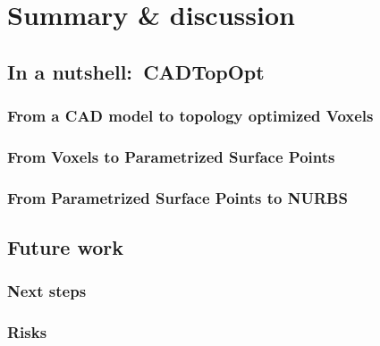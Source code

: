 \chapter{Summary \& discussion}
\label{chapter:Discussion}

\section{In a nutshell:\ \acl{CADTopOpt}}
\subsection{From a \acs{CAD} model to topology optimized Voxels}
\subsection{From Voxels to Parametrized Surface Points}
\subsection{From Parametrized Surface Points to \ac{NURBS}}

\section{Future work}
\subsection{Next steps}
\subsection{Risks}

